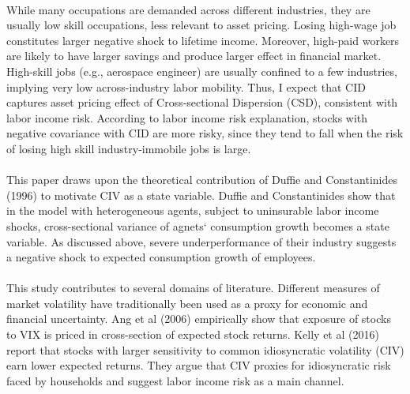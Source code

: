 \documentclass[12pt]{article}
\begin{document}
\paragraph{}
While many occupations are demanded across different industries, they are usually low skill occupations, less relevant to asset pricing. Losing high-wage job constitutes larger negative shock to lifetime income. Moreover, high-paid workers are likely to have larger savings and produce larger effect in financial market. High-skill jobs (e.g., aerospace engineer) are usually confined to a few industries, implying very low across-industry labor mobility. Thus, I expect that CID captures asset pricing effect of Cross-sectional Dispersion (CSD), consistent with labor income risk. According to labor income risk explanation, stocks with negative covariance with CID are more risky, since they tend to fall when the risk of losing high skill industry-immobile jobs is large.
\paragraph{}
This paper draws upon the theoretical contribution of Duffie and Constantinides (1996) to motivate CIV as a state variable. Duffie and Constantinides show that in the model with heterogeneous agents, subject to uninsurable labor income shocks, cross-sectional variance of agnets` consumption growth becomes a state variable. As discussed above, severe underperformance of their industry suggests a negative shock to expected consumption growth of employees.
\paragraph{}
This study contributes to several domains of literature. Different measures of market volatility have traditionally been used as a proxy for economic and financial uncertainty. Ang et al (2006) empirically show that exposure of stocks to VIX is priced in cross-section of expected stock returns. Kelly et al (2016) report that stocks with larger sensitivity to common idiosyncratic volatility (CIV) earn lower expected returns. They argue that CIV proxies for idiosyncratic risk faced by households and suggest labor income risk as a main channel.
\end{document}
